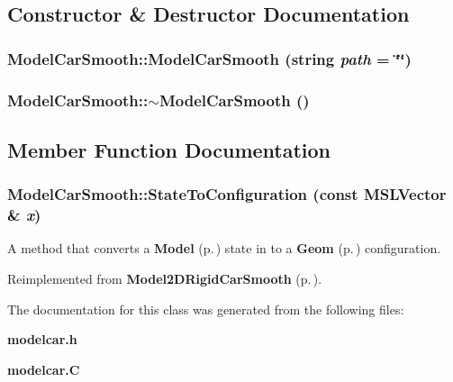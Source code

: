 \subsection{Constructor \& Destructor Documentation}
\subsubsection{\setlength{\rightskip}{0pt plus 5cm}Model\-Car\-Smooth::Model\-Car\-Smooth (string {\em path} = \char`\"{}\char`\"{})}\label{classModelCarSmooth_a0}


\subsubsection{\setlength{\rightskip}{0pt plus 5cm}Model\-Car\-Smooth::$\sim$Model\-Car\-Smooth ()\hspace{0.3cm}{\tt  [inline, virtual]}}\label{classModelCarSmooth_a1}




\subsection{Member Function Documentation}
\subsubsection{ Model\-Car\-Smooth::State\-To\-Configuration (const {\bf MSLVector} \& {\em x})\hspace{0.3cm}{\tt  [virtual]}}\label{classModelCarSmooth_a2}


A method that converts a {\bf Model} {\rm (p.\,\pageref{classModel})} state in to a {\bf Geom} {\rm (p.\,\pageref{classGeom})} configuration.



Reimplemented from {\bf Model2DRigid\-Car\-Smooth} {\rm (p.\,\pageref{classModel2DRigidCarSmooth_a5})}.

The documentation for this class was generated from the following files:\begin{CompactItemize}
\item 
{\bf modelcar.h}\item 
{\bf modelcar.C}\end{CompactItemize}
